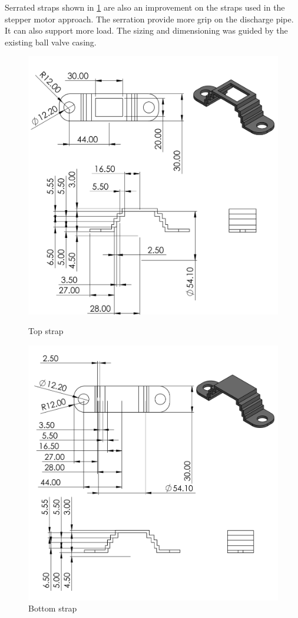 \begin{enumerate}
\begin{enumerate}
    Serrated straps shown in \ref{fig:two_rail_serrated_straps} are also an improvement on the straps used in the stepper motor approach. The serration provide more grip on the discharge pipe. It can also support more load. The sizing and dimensioning was guided by the existing ball valve casing.
    \begin{figure}[H]
        \centering
        \includegraphics[height=.45\textheight]{Figures/twoRailStrapsTop.PNG}
        \caption{Top strap}
        \includegraphics[height=.45\textheight]{Figures/twoRailStrapsBottom.PNG}
        \caption{Bottom strap}
        \label{fig:two_rail_serrated_straps}
    \end{figure}
      

\end{enumerate}
\end{enumerate}
